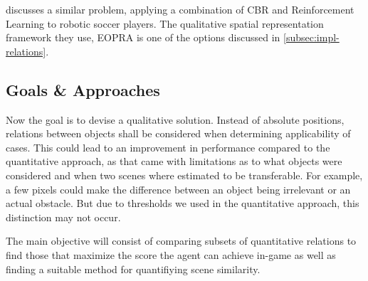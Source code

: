

\cite{QCBR} discusses a similar problem, applying a combination of \ac{CBR} and Reinforcement Learning to robotic soccer players.
The qualitative spatial representation framework they use, \ac{EOPRA} is one of the options discussed in \ref{subsec:impl-relations}.



\subsection{Goals \& Approaches}

Now the goal is to devise a qualitative solution.
Instead of absolute positions, relations between objects shall be considered when determining applicability of cases.
This could lead to an improvement in performance compared to the quantitative approach, as that came with limitations as to what objects were considered and when two scenes where estimated to be transferable. %
For example, a few pixels could make the difference between an object being irrelevant or an actual obstacle.
But due to thresholds we used in the quantitative approach, this distinction may not occur. %

The main objective will consist of comparing subsets of quantitative relations to find those that maximize the score the agent can achieve in-game as well as finding a suitable method for quantifiying scene similarity.
